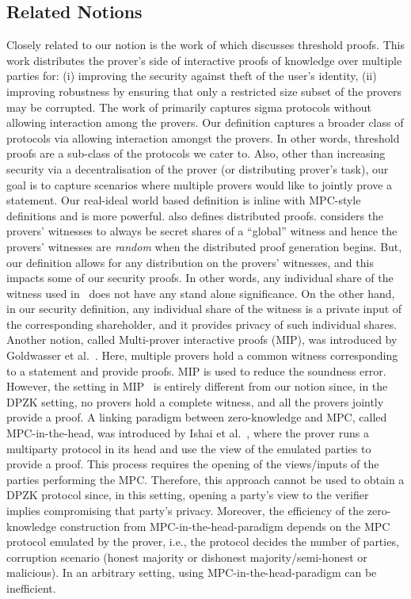 \subsection{Related Notions}\label{subsec:related_notion}
Closely related to our notion is the work of \cite{EfficientTZ} which discusses threshold proofs. This work distributes the prover's side of interactive proofs of knowledge over multiple parties for: (i) improving the security against theft of the user's identity, (ii) improving robustness by ensuring that only a restricted size subset of the provers may be corrupted. The work of \cite{EfficientTZ} primarily captures sigma protocols without allowing interaction among the provers. Our definition captures a broader class of protocols via allowing interaction amongst the provers.  In other words, threshold proofs are a sub-class of the protocols we cater to. Also, other than increasing security via a decentralisation of the prover (or distributing prover's task), our goal is to capture scenarios where multiple provers would like to jointly prove a statement.  Our real-ideal world based definition is inline with MPC-style definitions and is more powerful. \cite{Ped92} also defines distributed proofs. \cite{Ped92} considers the provers' witnesses to always be secret shares of a ``global'' witness and hence the provers' witnesses are \textit{random} when the distributed proof generation begins. But, our definition allows for any distribution on the provers' witnesses, and this impacts some of our security proofs. In other words, any individual share of the witness used in~\cite{Ped92} does not have any stand alone significance. On the other hand, in our security definition, any individual share of the witness is a private input of the corresponding shareholder, and it provides privacy of such individual shares. 
Another notion, called Multi-prover interactive proofs (MIP), was introduced by Goldwasser et al.~\cite{ben2019multi}. Here, multiple provers hold a common witness corresponding to a statement and provide proofs. MIP is used to reduce the soundness error. However, the setting in MIP~\cite{ben2019multi, blumberg2014} is entirely different from our notion since, in the DPZK setting, no provers hold a complete witness, and all the provers jointly provide a proof.
A linking paradigm between zero-knowledge and MPC, called MPC-in-the-head, was introduced by Ishai et al.~\cite{MPCinthehead}, where the prover runs a multiparty protocol in its head and use the view of the emulated parties to provide a proof. This process requires the opening of the views/inputs of the parties performing the MPC. Therefore, this approach cannot be used to obtain a DPZK protocol since, in this setting, opening a party's view to the verifier implies compromising that party's privacy.  Moreover, the efficiency of the zero-knowledge construction from MPC-in-the-head-paradigm depends on the MPC protocol emulated by the prover, i.e., the protocol decides the number of parties, corruption scenario (honest majority or dishonest majority/semi-honest or malicious). In an arbitrary setting, using MPC-in-the-head-paradigm can be inefficient.
